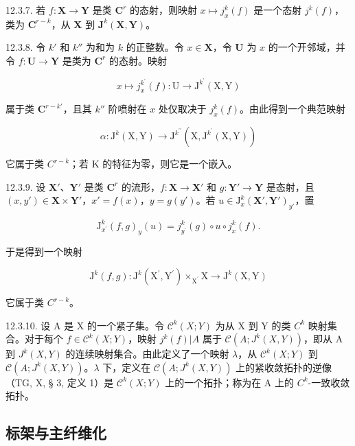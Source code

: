 12.3.7. 若 \(f: \mathbf{X} \to \mathbf{Y}\) 是类 \(\mathbf{C}^r\) 的态射，则映射 \(x \mapsto j_x^k(f)\) 是一个态射 \(j^k(f)\)，类为 \(\mathbf{C}^{r-k}\)，从 \(\mathbf{X}\) 到 \(\mathbf{J}^k(\mathbf{X}, \mathbf{Y})\)。

12.3.8. 令 \(k'\) 和 \(k''\) 为和为 \(k\) 的正整数。令 \(x \in \mathbf{X}\)，令 \(\mathbf{U}\) 为 \(x\) 的一个开邻域，并令 \(f: \mathbf{U} \to \mathbf{Y}\) 是类为 \(\mathbf{C}^{r}\) 的态射。映射

\[
x \mapsto j _ {x} ^ {k ^ {\prime}} (f) \colon \mathrm{U} \to \mathrm{J} ^ {k ^ {\prime}} (\mathrm{X}, \mathrm{Y})
\]

属于类 \(\mathbf{C}^{r - k'}\)，且其 \(k''\) 阶喷射在 \(x\) 处仅取决于 \(j_x^k (f)\)。由此得到一个典范映射

\[
\alpha \colon \mathrm{J} ^ {k} (\mathrm{X}, \mathrm{Y}) \rightarrow \mathrm{J} ^ {k ^ {\prime \prime}} (\mathrm{X}, \mathrm{J} ^ {k ^ {\prime}} (\mathrm{X}, \mathrm{Y}))
\]

它属于类 \(C^{r-k}\)；若 K 的特征为零，则它是一个嵌入。

12.3.9. 设 \(\mathbf{X}'\)、\(\mathbf{Y}'\) 是类 \(\mathbf{C}^r\) 的流形，\(f: \mathbf{X} \to \mathbf{X}'\) 和 \(g: \mathbf{Y}' \to \mathbf{Y}\) 是态射，且 \((x, y') \in \mathbf{X} \times \mathbf{Y}'\)，\(x' = f(x)\)，\(y = g(y')\)。若 \(u \in \mathrm{J}_x^k(\mathbf{X}', \mathbf{Y}')_{y'}\)，置

\[
\mathrm{J} _ {x ^ {\prime}} ^ {k} (f, g) _ {y} (u) = j _ {y ^ {\prime}} ^ {k} (g) \circ u \circ j _ {x} ^ {k} (f).
\]

于是得到一个映射

\[
\mathrm{J} ^ {k} (f, g) \colon \mathrm{J} ^ {k} (\mathrm{X} ^ {\prime}, \mathrm{Y} ^ {\prime}) \times_ {\mathrm{X} ^ {\prime}} \mathrm{X} \rightarrow \mathrm{J} ^ {k} (\mathrm{X}, \mathrm{Y})
\]

它属于类 \(C^{r-k}\)。

12.3.10. 设 A 是 X 的一个紧子集。令 \(\mathcal{C}^{k}(X;Y)\) 为从 X 到 Y 的类 \(C^{k}\) 映射集合。对于每个 \(f\in\mathcal{C}^{k}(X;Y)\)，映射 \(j^{k}(f)|A\) 属于 \(\mathcal{C}(A;J^{k}(X,Y))\)，即从 A 到 \(J^{k}(X,Y)\) 的连续映射集合。由此定义了一个映射 \(\lambda\)，从 \(\mathcal{C}^{k}(X;Y)\) 到 \(\mathcal{C}(A;J^{k}(X,Y))\)。\(\lambda\) 下，定义在 \(\mathcal{C}(A;J^{k}(X,Y))\) 上的紧收敛拓扑的逆像（TG, X, § 3, 定义 1）是 \(\mathcal{C}^{k}(X;Y)\) 上的一个拓扑；称为在 A 上的 \(C^{k}\)-一致收敛拓扑。

\subsection{标架与主纤维化}

